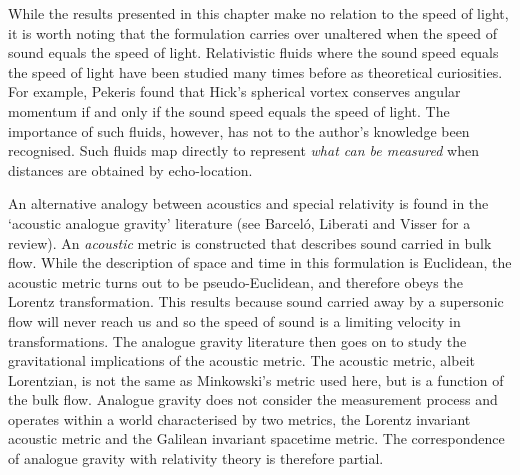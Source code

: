 While the results presented in this chapter make no relation to the speed of light, 
it is worth noting that the formulation carries over unaltered when the speed of sound equals the speed of light.
Relativistic fluids where the sound speed equals the speed of light have been studied many times before
as theoretical curiosities\cite{Taub1978,Pekeris1976, Pekeris1977}.
For example, Pekeris found that Hick's spherical vortex conserves angular momentum if and only if
the sound speed equals the speed of light\cite{Pekeris1977}.
The importance of such fluids, however, has not to the author's knowledge been recognised.
Such fluids map directly to represent {\em what can be measured} when distances are obtained by echo-location.

An alternative  analogy between acoustics and special relativity is found in the `acoustic analogue gravity' literature (see Barcel{\'o}, Liberati and Visser\cite{Barcelo2005} for a review).
An {\em acoustic} metric is constructed that describes sound carried in bulk flow.
While the description of space and time in this formulation is Euclidean, the acoustic metric turns out to be pseudo-Euclidean,
and therefore obeys the Lorentz transformation.
This results because  sound carried away by a supersonic flow will never reach us
and so the speed of sound is a limiting velocity in transformations.
The analogue gravity literature then goes on to study the gravitational implications of the acoustic metric.
The acoustic metric, albeit Lorentzian, is not the same as Minkowski's metric used here, 
but is a function of the bulk flow.
Analogue gravity does not consider the measurement process and  operates within a world characterised by two metrics, 
the Lorentz invariant acoustic metric
 and the Galilean invariant spacetime  metric.
The correspondence of analogue gravity with relativity theory is therefore partial.


